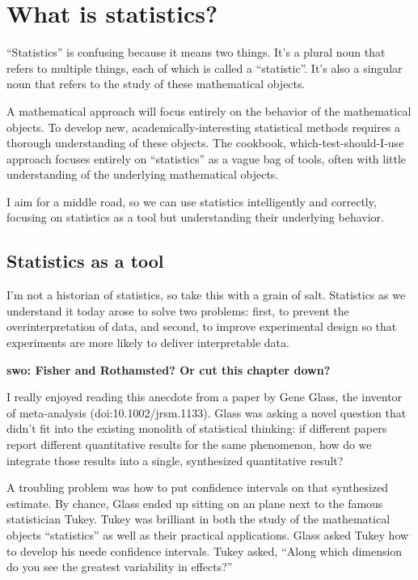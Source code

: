
\chapter{What is statistics?}

``Statistics'' is confusing because it means two things. It's a plural noun that
refers to multiple things, each of which is called a ``statistic''. It's also a
singular noun that refers to the study of these mathematical objects.

A mathematical approach will focus entirely on the behavior of the
mathematical objects. To develop new, academically-interesting statistical
methods requires a thorough understanding of these objects. The cookbook,
which-test-should-I-use approach focuses entirely on ``statistics'' as a vague
bag of tools, often with little understanding of the underlying mathematical
objects.

I aim for a middle road, so we can use statistics intelligently and correctly,
focusing on statistics as a tool but understanding their underlying behavior.

\section{Statistics as a tool}

I'm not a historian of statistics, so take this with a grain of salt.
Statistics as we understand it today arose to solve two problems: first, to
prevent the overinterpretation of data, and second, to improve experimental
design so that experiments are more likely to deliver interpretable data.

\textbf{swo: Fisher and Rothamsted? Or cut this chapter down?}

I really enjoyed reading this anecdote from a paper by Gene Glass, the
inventor of meta-analysis (doi:10.1002/jrsm.1133). Glass was asking a novel
question that didn't fit into the existing monolith of statistical thinking:
if different papers report different quantitative results for the same
phenomenon, how do we integrate those results into a single, synthesized
quantitative result?

A troubling problem was how to put confidence intervals on that synthesized
estimate. By chance, Glass ended up sitting on an plane next to the famous
statistician Tukey. Tukey was brilliant in both the study of the mathematical
objects ``statistics'' as well as their practical applications. Glass asked
Tukey how to develop his neede confidence intervals. Tukey asked, ``Along
which dimension do you see the greatest variability in effects?''

